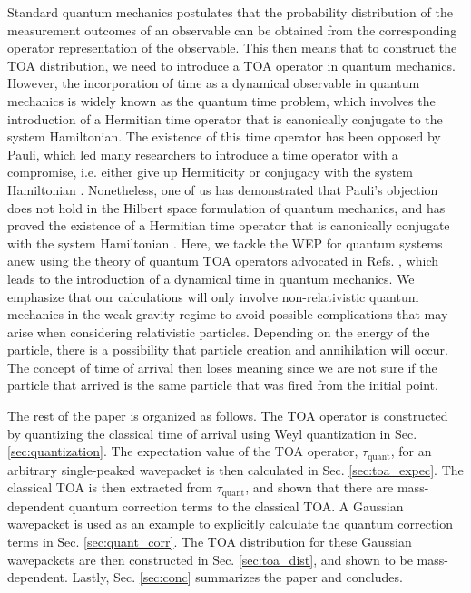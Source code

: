 \documentclass[%
 reprint,
 amsmath,amssymb,
 aps,
]{revtex4-1}
\begin{document}
Standard quantum mechanics postulates that the probability distribution of the measurement outcomes of an observable can be obtained from the corresponding operator representation of the observable. This then means that to construct the TOA distribution, we need to introduce a TOA operator in quantum mechanics. However, the incorporation of time as a dynamical observable in quantum mechanics is widely known as the quantum time problem, which involves the introduction of a Hermitian time operator that is canonically conjugate to the system Hamiltonian. The existence of this time operator has been opposed by Pauli, which led many researchers to introduce a time operator with a compromise, i.e. either give up Hermiticity or conjugacy with the system Hamiltonian \cite{toa2a,toa2b}. Nonetheless, one of us has demonstrated that Pauli's objection does not hold in the Hilbert space formulation of quantum mechanics, and has proved the existence of a Hermitian time operator that is canonically conjugate with the system Hamiltonian \cite{G2002PRSLA1_a,G2002PRSLA1_b,GCB2004PRL_a,GCB2004PRL_b}. Here, we tackle the WEP for quantum systems anew using the theory of quantum TOA operators advocated in Refs. \cite{G2002PRSLA1_a,G2002PRSLA1_b}, which leads to the introduction of a dynamical time in quantum mechanics. We emphasize that our calculations will only involve non-relativistic quantum mechanics in the weak gravity regime to avoid possible complications that may arise when considering relativistic particles. Depending on the energy of the particle, there is a possibility that particle creation and annihilation will occur. The concept of time of arrival then loses meaning since we are not sure if the particle that arrived is the same particle that was fired from the initial point. 

The rest of the paper is organized as follows. The TOA operator is constructed by quantizing the classical time of arrival using Weyl quantization in Sec. \ref{sec:quantization}. The expectation value of the TOA operator, $\tau_{\text{quant}}$, for an arbitrary single-peaked wavepacket is then calculated in Sec. \ref{sec:toa_expec}. The classical TOA is then extracted from $\tau_{\text{quant}}$, and shown that there are mass-dependent quantum correction terms to the classical TOA. A Gaussian wavepacket is used as an example to explicitly calculate the quantum correction terms in Sec. \ref{sec:quant_corr}. The TOA distribution for these Gaussian wavepackets are then constructed in Sec. \ref{sec:toa_dist}, and shown to be mass-dependent. Lastly, Sec. \ref{sec:conc} summarizes the paper and concludes.
\end{document}
